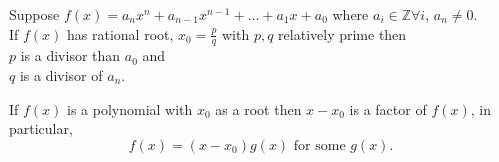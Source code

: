 \documentclass{report}
\begin{document}
 {
      Suppose $ f \left( x \right) = a_n x^{n}+ a_{ n-1 }x^{n-1}+ \ldots + a_1 x + a_0$ where $ a_i \in \mathbb{Z} \forall  i$, $ a_n \neq 0$.\\
      If $ f \left( x \right) $ has rational root, $ x_0 = \frac{p}{q}$  with $ p, q$ relatively prime then\\
      $ p $ is a divisor than $ a_0$ and \\
      $ q $ is a divisor of $ a_n$.
 }
 
 {
               If $ f \left( x \right) $ is a polynomial with  $ x_0$ as a root then $ x-x_0 $ is a factor of $ f \left(  x \right) $, in particular,
	       \[
	       f\left( x \right) = \left( x-x_0 \right) g \left( x \right)  \text{ for some } g \left( x \right) 
	       .\] 
 }
 
\end{document}
